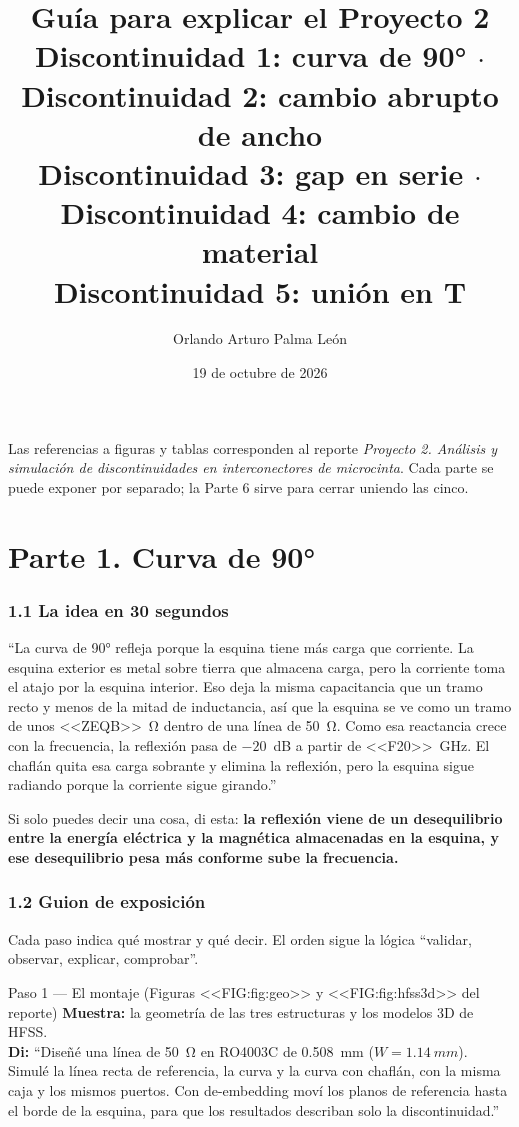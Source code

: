 \documentclass[11pt,letterpaper]{article}
\title{\textbf{Guía para explicar el Proyecto 2}\\[4pt]\large Discontinuidad 1: curva de \ang{90} $\cdot$ Discontinuidad 2: cambio abrupto de ancho\\ Discontinuidad 3: gap en serie $\cdot$ Discontinuidad 4: cambio de material\\ Discontinuidad 5: unión en T}
\author{Orlando Arturo Palma León}
\date{19 de octubre de 2026}
\begin{document}
\maketitle

Las referencias a figuras y tablas corresponden al reporte \emph{Proyecto 2. Análisis y simulación de discontinuidades en interconectores de microcinta}. Cada parte se puede exponer por separado; la Parte 6 sirve para cerrar uniendo las cinco.

\part*{Parte 1. Curva de \ang{90}}

\section*{1.1 La idea en 30 segundos}
\begin{idea}
``La curva de \ang{90} refleja porque la esquina tiene más carga que corriente. La esquina exterior es metal sobre tierra que almacena carga, pero la corriente toma el atajo por la esquina interior. Eso deja la misma capacitancia que un tramo recto y menos de la mitad de inductancia, así que la esquina se ve como un tramo de unos \SI{<<ZEQB>>}{\ohm} dentro de una línea de \SI{50}{\ohm}. Como esa reactancia crece con la frecuencia, la reflexión pasa de $-20$~dB a partir de \SI{<<F20>>}{GHz}. El chaflán quita esa carga sobrante y elimina la reflexión, pero la esquina sigue radiando porque la corriente sigue girando.''
\end{idea}

Si solo puedes decir una cosa, di esta: \textbf{la reflexión viene de un desequilibrio entre la energía eléctrica y la magnética almacenadas en la esquina, y ese desequilibrio pesa más conforme sube la frecuencia.}

\section*{1.2 Guion de exposición}
Cada paso indica qué mostrar y qué decir. El orden sigue la lógica ``validar, observar, explicar, comprobar''.

\begin{paso}{Paso 1 --- El montaje (Figuras <<FIG:fig:geo>> y <<FIG:fig:hfss3d>> del reporte)}
\textbf{Muestra:} la geometría de las tres estructuras y los modelos 3D de HFSS.\\
\textbf{Di:} ``Diseñé una línea de \SI{50}{\ohm} en RO4003C de \SI{0.508}{mm} ($W=\SI{1.14}{mm}$). Simulé la línea recta de referencia, la curva y la curva con chaflán, con la misma caja y los mismos puertos. Con de-embedding moví los planos de referencia hasta el borde de la esquina, para que los resultados describan solo la discontinuidad.''
\end{paso}
\end{document}
